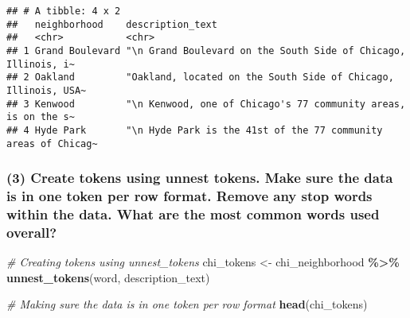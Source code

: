 \documentclass[
]{article}
\newenvironment{Shaded}{\begin{snugshade}}{\end{snugshade}}
\newcommand{\CommentTok}[1]{\textcolor[rgb]{0.56,0.35,0.01}{\textit{#1}}}
\newcommand{\FunctionTok}[1]{\textcolor[rgb]{0.13,0.29,0.53}{\textbf{#1}}}
\newcommand{\NormalTok}[1]{#1}
\newcommand{\OtherTok}[1]{\textcolor[rgb]{0.56,0.35,0.01}{#1}}
\newcommand{\SpecialCharTok}[1]{\textcolor[rgb]{0.81,0.36,0.00}{\textbf{#1}}}
\newcommand{\StringTok}[1]{\textcolor[rgb]{0.31,0.60,0.02}{#1}}
\begin{document}
\begin{Shaded}
\end{Shaded}

\begin{verbatim}
## # A tibble: 4 x 2
##   neighborhood    description_text                                              
##   <chr>           <chr>                                                         
## 1 Grand Boulevard "\n Grand Boulevard on the South Side of Chicago, Illinois, i~
## 2 Oakland         "Oakland, located on the South Side of Chicago, Illinois, USA~
## 3 Kenwood         "\n Kenwood, one of Chicago's 77 community areas, is on the s~
## 4 Hyde Park       "\n Hyde Park is the 41st of the 77 community areas of Chicag~
\end{verbatim}

\hypertarget{create-tokens-using-unnest-tokens.-make-sure-the-data-is-in-one-token-per-row-format.-remove-any-stop-words-within-the-data.-what-are-the-most-common-words-used-overall}{%
\subsubsection{(3) Create tokens using unnest tokens. Make sure the data
is in one token per row format. Remove any stop words within the data.
What are the most common words used
overall?}\label{create-tokens-using-unnest-tokens.-make-sure-the-data-is-in-one-token-per-row-format.-remove-any-stop-words-within-the-data.-what-are-the-most-common-words-used-overall}}

\begin{Shaded}
\begin{Highlighting}[]
\CommentTok{\# Creating tokens using unnest\_tokens}
\NormalTok{chi\_tokens }\OtherTok{\textless{}{-}}\NormalTok{ chi\_neighborhood }\SpecialCharTok{\%\textgreater{}\%}
  \FunctionTok{unnest\_tokens}\NormalTok{(word, description\_text)}

\CommentTok{\# Making sure the data is in one token per row format}
\FunctionTok{head}\NormalTok{(chi\_tokens)}
\end{Highlighting}
\end{Shaded}
\end{document}
